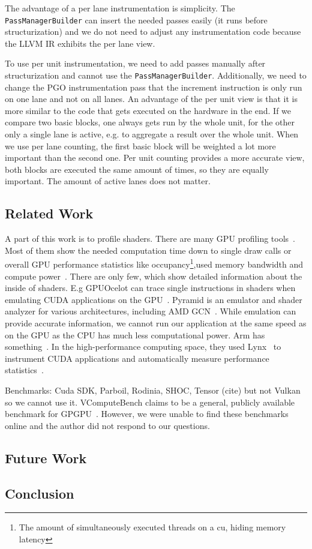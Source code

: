 The advantage of a per lane instrumentation is simplicity. The \texttt{PassManagerBuilder} can insert the needed passes easily (it runs before structurization) and we do not need to adjust any instrumentation code because the LLVM IR exhibits the per lane view.

To use per unit instrumentation, we need to add passes manually after structurization and cannot use the \texttt{PassManagerBuilder}.
Additionally, we need to change the PGO instrumentation pass that the increment instruction is only run on one lane and not on all lanes.
An advantage of the per unit view is that it is more similar to the code that gets executed on the hardware in the end.
If we compare two basic blocks, one always gets run by the whole unit, for the other only a single lane is active, e.g. to aggregate a result over the whole unit.
When we use per lane counting, the first basic block will be weighted a lot more important than the second one.
Per unit counting provides a more accurate view, both blocks are executed the same amount of times, so they are equally important. The amount of active lanes does not matter.

\subsection{Related Work}
\label{sub:relatedwork}
A part of this work is to profile shaders. There are many GPU profiling tools~\cite{UnityGPUProfiler, UnrealGPUProfiling, MSGPUUsage, PGI2014}.
Most of them show the needed computation time down to single draw calls or overall GPU performance statistics like occupancy\footnote{The amount of simultaneously executed threads on a \gls{cu}, hiding memory latency},used memory bandwidth and compute power~\cite{NvidiaNsight, NvidiaShaderPerf, AMDShaderAnalyzer}.
There are only few, which show detailed information about the inside of shaders. E.g GPUOcelot can trace single instructions in shaders when emulating CUDA applications on the GPU~\cite{GPUOcelot, Lakshminarayana2010}. Pyramid is an emulator and shader analyzer for various architectures, including AMD GCN~\cite{Pyramid}.
While emulation can provide accurate information, we cannot run our application at the same speed as on the GPU as the CPU has much less computational power.
Arm has something~\cite{Barton2013}.
In the high-performance computing space, they used Lynx~\cite{Lynx} to instrument CUDA applications and automatically measure performance statistics~\cite{Farooqui2014}.

Benchmarks: Cuda SDK, Parboil, Rodinia, SHOC, Tensor (cite) but not Vulkan so we cannot use it. VComputeBench claims to be a general, publicly available benchmark for GPGPU~\cite{Mammeri2018}. However, we were unable to find these benchmarks online and the author did not respond to our questions.

\subsection{Future Work}
\label{sub:futurework}

\subsection{Conclusion}
\label{sub:conclusion}